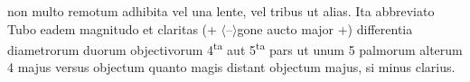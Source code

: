 non multo remotum adhibita vel una lente\protect{}, vel tribus ut alias. Ita abbreviato Tubo eadem magnitudo et claritas (+ $\langle$--$\rangle$gone aucto major +) differentia diametrorum duorum objectivorum 4\textsuperscript{ta} aut 5\textsuperscript{ta} pars ut unum 5 palmorum alterum 4 majus versus objectum quanto magis distant objectum majus, si minus clarius.\pend 